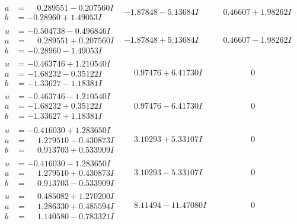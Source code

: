 \documentclass[1p]{elsarticle_modified}
\theoremstyle{definition}
\begin{document}
$$\begin{array}{c|c|c}
\begin{aligned}
a &= \phantom{-}0.289551 - 0.207560 I \\
b &= -0.28960 + 1.49053 I\end{aligned}
 & -1.87848 - 5.13684 I & \phantom{-}0.46607 + 1.98262 I \\ \hline\begin{aligned}
u &= -0.504738 - 0.496846 I \\
a &= \phantom{-}0.289551 + 0.207560 I \\
b &= -0.28960 - 1.49053 I\end{aligned}
 & -1.87848 + 5.13684 I & \phantom{-}0.46607 - 1.98262 I \\ \hline\begin{aligned}
u &= -0.463746 + 1.210540 I \\
a &= -1.68232 - 0.35122 I \\
b &= -1.33627 - 1.18381 I\end{aligned}
 & \phantom{-}0.97476 + 6.41730 I & \phantom{-0.000000 } 0 \\ \hline\begin{aligned}
u &= -0.463746 - 1.210540 I \\
a &= -1.68232 + 0.35122 I \\
b &= -1.33627 + 1.18381 I\end{aligned}
 & \phantom{-}0.97476 - 6.41730 I & \phantom{-0.000000 } 0 \\ \hline\begin{aligned}
u &= -0.416030 + 1.283650 I \\
a &= \phantom{-}1.279510 - 0.430873 I \\
b &= \phantom{-}0.913703 + 0.533909 I\end{aligned}
 & \phantom{-}3.10293 + 5.33107 I & \phantom{-0.000000 } 0 \\ \hline\begin{aligned}
u &= -0.416030 - 1.283650 I \\
a &= \phantom{-}1.279510 + 0.430873 I \\
b &= \phantom{-}0.913703 - 0.533909 I\end{aligned}
 & \phantom{-}3.10293 - 5.33107 I & \phantom{-0.000000 } 0 \\ \hline\begin{aligned}
u &= \phantom{-}0.485082 + 1.270200 I \\
a &= \phantom{-}1.286330 + 0.485594 I \\
b &= \phantom{-}1.140580 - 0.783321 I\end{aligned}
 & \phantom{-}8.11494 - 11.47080 I & \phantom{-0.000000 } 0 \\ \hline\begin{aligned}

\end{aligned}
\end{array}$$
\end{document}
